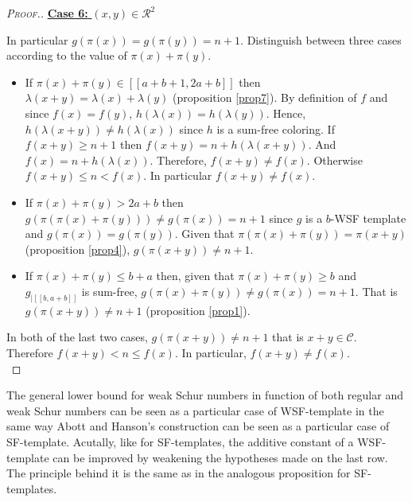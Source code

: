 \begin{proof}[\textsc{Proof.}]
\noindent \underline{\textbf{Case 6:} \((x,y) \in \mathcal{R}^2\)}
\par
In particular \(g(\pi(x)) = g(\pi(y))=n + 1\). Distinguish between three cases according to the value of \(\pi(x) + \pi(y)\).
\begin{itemize}
\item If \(\pi(x) + \pi(y) \in [\![a + b + 1, 2 a + b]\!]\) then \(\lambda(x + y) = \lambda(x) + \lambda(y)\) 
	(proposition \ref{prop7}). By definition of \(f\) and since \(f(x) = f(y)\), \(h(\lambda(x)) = h(\lambda(y))\).
	Hence, \(h(\lambda(x + y)) \neq h(\lambda(x))\) since \(h\) is a sum-free coloring. If \(f(x+y) \geqslant n + 1\) 
	then \(f(x + y) = n + h(\lambda(x + y))\). And \(f(x) = n + h(\lambda(x))\). Therefore, \(f(x + y)  \neq f(x)\). 
	Otherwise \(f(x+y) \leqslant n < f(x)\). In particular \(f(x + y) \neq f(x)\).
\item If \(\pi(x)+\pi(y)>2a+b\) then \(g(\pi(\pi(x)+\pi(y))) \neq g(\pi(x)) = n + 1\) since \(g\) is a \(b\)-WSF template and 
	\(g(\pi(x)) = g(\pi(y))\). Given that \(\pi(\pi(x)+\pi(y)) = \pi(x+y)\) (proposition \ref{prop4}), \(g(\pi(x+y)) \neq n + 1\).
\item \begin{sloppypar}
	If \(\pi(x)+\pi(y)\leqslant b+a\) then, given that \(\pi(x)+\pi(y) \geqslant b\) and \(g_{| [\![b, a + b ]\!]}\) is 
	sum-free, \({g(\pi(x) + \pi(y)) \neq g(\pi(x)) = n + 1}\). That is \({g(\pi(x + y)) \neq n + 1}\) (proposition \ref{prop1}).
	\end{sloppypar}
\end{itemize}
\par
In both of the last two cases, \({g(\pi(x + y)) \neq n + 1}\) that is \(x+y \in \mathcal{C}\). Therefore \(f(x+y) < n \leqslant f(x)\). 
In particular, \(f(x + y) \neq f(x)\). \\
\end{proof}

The general lower bound for weak Schur numbers in function of both regular and weak Schur numbers can be seen as a particular
case of WSF-template in the same way Abott and Hanson's construction can be seen as a particular case of SF-template. Acutally,
like for SF-templates, the additive constant of a WSF-template can be improved by weakening the hypotheses made on
the last row. The principle behind it is the same as in the analogous proposition for SF-templates.

